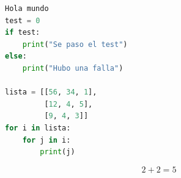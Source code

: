 \begin{table}[H]
  \centering
    \caption{Ejemplo}
  \label{tab:test}
\end{table}

\begin{lstlisting}[language=Python,caption={Ejemplo}]
Hola mundo
test = 0
if test:
	print("Se paso el test")
else:
	print("Hubo una falla")
 
lista = [[56, 34, 1],
         [12, 4, 5],
         [9, 4, 3]]
for i in lista:
    for j in i:
        print(j)
\end{lstlisting}

\begin{equation}
    2 + 2 = 5
     \label{eq:test}
\end{equation}

